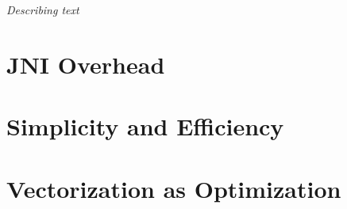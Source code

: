 \textit{Describing text}

\section{JNI Overhead}

\section{Simplicity and Efficiency}

\section{Vectorization as Optimization}








% 

% 

